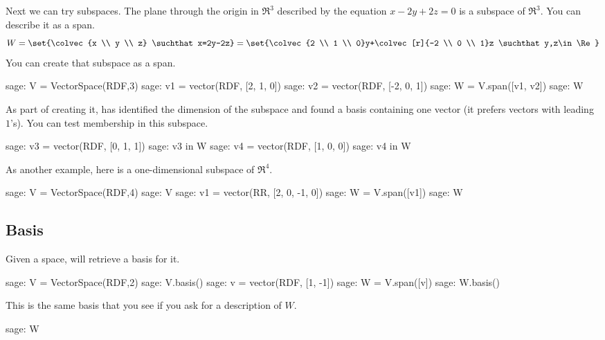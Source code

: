 Next we can try subspaces.
The plane through the origin in $\Re^3$ described by the equation
$x-2y+2z=0$
is a subspace of $\Re^3$.
You can describe it as a span.
\begin{equation*}
  W=\set{\colvec{x \\ y \\ z}
    \suchthat x=2y-2z}
  =\set{\colvec{2 \\ 1 \\ 0}y+\colvec[r]{-2 \\ 0 \\ 1}z
        \suchthat y,z\in\Re}
\end{equation*}
You can create that subspace as a span.
\begin{sagecommandline}
sage: V = VectorSpace(RDF,3)
sage: v1 = vector(RDF, [2, 1, 0])
sage: v2 = vector(RDF, [-2, 0, 1])
sage: W = V.span([v1, v2])
sage: W
\end{sagecommandline}
As part of creating it,
\Sage{} has identified the dimension of the subspace and found
a basis containing one vector (it prefers vectors with leading~$1$'s).
You can test membership in this subspace. 
\begin{sagecommandline}
sage: v3 = vector(RDF, [0, 1, 1])
sage: v3 in W
sage: v4 = vector(RDF, [1, 0, 0])
sage: v4 in W
\end{sagecommandline}

As another example, here is a one-dimensional subspace of $\Re^4$.
\begin{sagecommandline}
sage: V = VectorSpace(RDF,4)
sage: V
sage: v1 = vector(RR, [2, 0, -1, 0])
sage: W = V.span([v1])
sage: W
\end{sagecommandline}



\subsection{Basis}
Given a space, \Sage{} will retrieve a basis for it.
\begin{sagecommandline}
sage: V = VectorSpace(RDF,2)
sage: V.basis()
sage: v = vector(RDF, [1, -1])
sage: W = V.span([v])     
sage: W.basis()
\end{sagecommandline}
\noindent
This is the same basis that you see if you ask for a description of $W$.
\begin{sagecommandline}
sage: W  
\end{sagecommandline}


